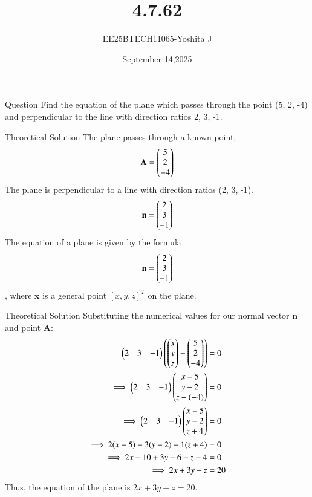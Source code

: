 \documentclass{beamer}
\begin{document}
\title 
{4.7.62}
\date{September 14,2025}


\author 
{EE25BTECH11065-Yoshita J}






\frame{\titlepage}
\begin{frame}{Question}
Find the equation of the plane which passes through the point (5, 2, -4) and perpendicular to the line with direction ratios 2, 3, -1.\\

\end{frame}


\begin{frame}{Theoretical Solution}
The plane passes through a known point,
\[ \mathbf{A} = \begin{pmatrix}5\\2\\-4\end{pmatrix} \]
The plane is perpendicular to a line with direction ratios (2, 3, -1). 
\[ \mathbf{n} = \begin{pmatrix}2\\3\\-1\end{pmatrix} \]
The equation of a plane is given by the formula \[ \mathbf{n} = \begin{pmatrix}2\\3\\-1\end{pmatrix} \], where $\mathbf{x}$ is a general point $[x, y, z]^T$ on the plane.
\end{frame}

\begin{frame}{Theoretical Solution}
Substituting the numerical values for our normal vector $\mathbf{n}$ and point $\mathbf{A}$:
\begin{align}
    \begin{pmatrix}2 & 3 & -1\end{pmatrix} \left( \begin{pmatrix}x\\y\\z\end{pmatrix} - \begin{pmatrix}5\\2\\-4\end{pmatrix} \right) &= 0 \\
    \implies \begin{pmatrix}2 & 3 & -1\end{pmatrix} \begin{pmatrix}x-5\\y-2\\z-(-4)\end{pmatrix} &= 0 \\
    \implies \begin{pmatrix}2 & 3 & -1\end{pmatrix} \begin{pmatrix}x-5\\y-2\\z+4\end{pmatrix} &= 0 \\
    \implies 2(x-5) + 3(y-2) - 1(z+4) &= 0 \\
    \implies 2x - 10 + 3y - 6 - z - 4 &= 0 \\
    \implies 2x + 3y - z &= 20
\end{align}
Thus, the equation of the plane is $2x + 3y - z = 20$.
\end{frame}
\end{document}
